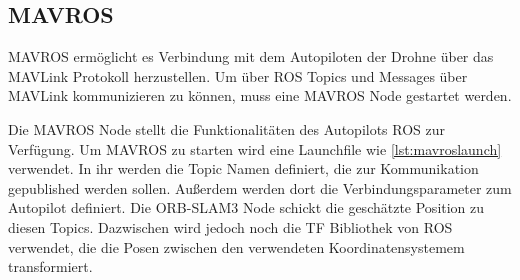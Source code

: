 \subsection{MAVROS}

MAVROS ermöglicht es Verbindung mit dem Autopiloten der Drohne über das MAVLink Protokoll herzustellen. Um über ROS Topics und Messages über MAVLink kommunizieren zu können, muss eine MAVROS Node gestartet werden.

Die MAVROS Node stellt die Funktionalitäten des Autopilots \ac{ROS} zur Verfügung. Um MAVROS zu starten wird eine Launchfile wie \ref{lst:mavroslaunch} verwendet. In ihr werden die Topic Namen definiert, die zur Kommunikation gepublished werden sollen. Außerdem werden dort die Verbindungsparameter zum Autopilot definiert. Die ORB-SLAM3 Node schickt die geschätzte Position zu diesen Topics. Dazwischen wird jedoch noch die \ac{TF} Bibliothek von \ac{ROS} verwendet, die die Posen zwischen den verwendeten Koordinatensystemem transformiert. 



